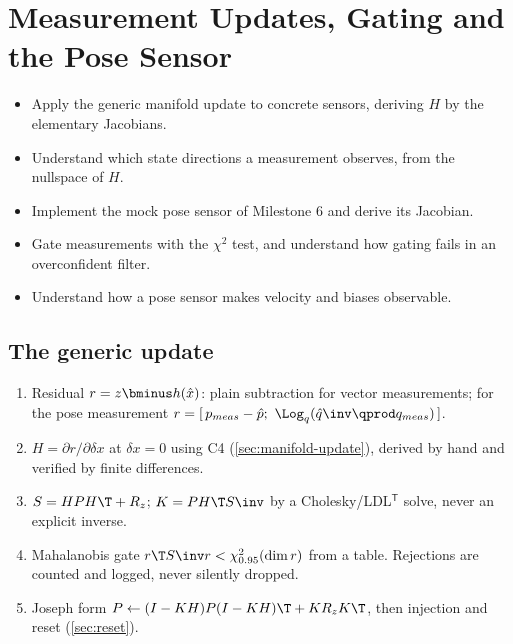 \chapter{Measurement Updates, Gating and the Pose Sensor}
\label{ch:updates}

\begin{objectives}
\begin{itemize}
  \item Apply the generic manifold update to concrete sensors, deriving $H$ by the elementary Jacobians.
  \item Understand which state directions a measurement observes, from the nullspace of $H$.
  \item Implement the mock pose sensor of Milestone 6 and derive its Jacobian.
  \item Gate measurements with the $\chi^2$ test, and understand how gating fails in an overconfident filter.
  \item Understand how a pose sensor makes velocity and biases observable.
\end{itemize}
\end{objectives}

\section{The generic update}

\begin{convention}
\begin{enumerate}
  \item Residual $r = z\bminus h(\hat x)$: plain subtraction for vector measurements; for the pose measurement
        $r = [\,p_{meas} - \hat p;\ \Log_q(\hat q\inv\qprod q_{meas})\,]$.
  \item $H = \partial r/\partial\delta x$ at $\delta x = 0$ using C4 (\cref{sec:manifold-update}), derived by hand and verified by
        finite differences.
  \item $S = HPH\T + R_z$; $K = PH\T S\inv$ by a Cholesky/LDL$^\mathsf{T}$ solve, never an explicit inverse.
  \item Mahalanobis gate $r\T S\inv r < \chi^2_{0.95}(\dim r)$ from a  table. Rejections are counted and
        logged, never silently dropped.
  \item Joseph form $P \gets (I - KH)P(I - KH)\T + KR_zK\T$, then injection and reset (\cref{sec:reset}).
\end{enumerate}
\end{convention}

